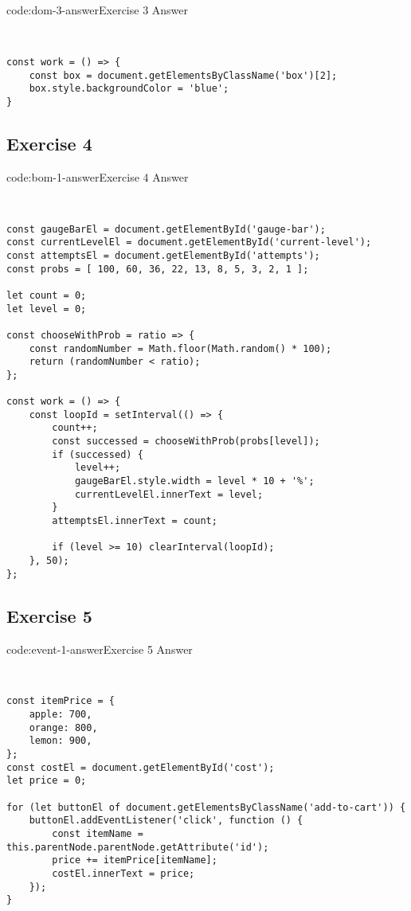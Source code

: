 \begin{codeenv}{code:dom-3-answer}{Exercise 3 Answer}\begin{verbatim}


const work = () => {
    const box = document.getElementsByClassName('box')[2];
    box.style.backgroundColor = 'blue';
}
\end{verbatim}
\end{codeenv}
\newpage

\subsection*{Exercise 4}

\begin{codeenv}{code:bom-1-answer}{Exercise 4 Answer}\begin{verbatim}


const gaugeBarEl = document.getElementById('gauge-bar');
const currentLevelEl = document.getElementById('current-level');
const attemptsEl = document.getElementById('attempts');
const probs = [ 100, 60, 36, 22, 13, 8, 5, 3, 2, 1 ];

let count = 0;
let level = 0;

const chooseWithProb = ratio => {
    const randomNumber = Math.floor(Math.random() * 100);
    return (randomNumber < ratio);
};

const work = () => {
    const loopId = setInterval(() => {
        count++;
        const successed = chooseWithProb(probs[level]);
        if (successed) {
            level++;
            gaugeBarEl.style.width = level * 10 + '%';
            currentLevelEl.innerText = level;
        }
        attemptsEl.innerText = count;

        if (level >= 10) clearInterval(loopId);
    }, 50);
};
\end{verbatim}
\end{codeenv}

\subsection*{Exercise 5}

\begin{codeenv}{code:event-1-answer}{Exercise 5 Answer}\begin{verbatim}


const itemPrice = {
    apple: 700, 
    orange: 800, 
    lemon: 900, 
};
const costEl = document.getElementById('cost');
let price = 0;

for (let buttonEl of document.getElementsByClassName('add-to-cart')) {
    buttonEl.addEventListener('click', function () {
        const itemName = this.parentNode.parentNode.getAttribute('id');
        price += itemPrice[itemName];
        costEl.innerText = price;
    });
}
\end{verbatim}
\end{codeenv}
\newpage

